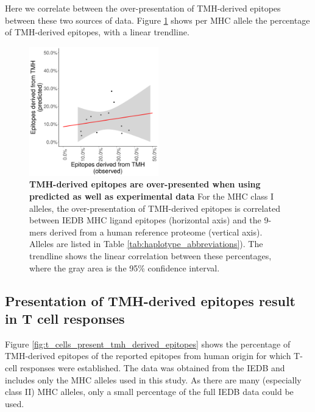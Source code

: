 Here we correlate between the over-presentation of TMH-derived
epitopes between these two sources of data.
Figure \ref{fig:thm_presentation_correlation} shows per MHC allele
the percentage of TMH-derived epitopes, with a linear trendline.

\begin{figure}[!htbp]
  \centering
  \includegraphics[width=0.5\textwidth]{bbbq_article_issue_157/figure_2c.png}
  \caption{
    \textbf{
      TMH-derived epitopes are over-presented when using
      predicted as well as experimental data
    }
    For the MHC class I alleles, the over-presentation of
    TMH-derived epitopes is correlated between 
    IEDB MHC ligand epitopes (horizontal axis) and the 9-mers
    derived from a human reference proteome (vertical axis).
    Alleles are listed in Table \ref{tab:haplotype_abbreviations}).
    The trendline shows the linear correlation between these
    percentages, where the gray area is the 95\% confidence interval.
  }
  \label{fig:thm_presentation_correlation}
\end{figure}

\clearpage

\subsection{Presentation of TMH-derived epitopes result in T cell responses}

Figure \ref{fig:t_cells_present_tmh_derived_epitopes} 
shows the percentage of TMH-derived
epitopes of the reported epitopes from human origin for which T-cell responses were established. 
The data was obtained from the IEDB and includes only the MHC
alleles used in this study. As there are many (especially class II)
MHC alleles, only a small percentage of the full IEDB data could be used.


